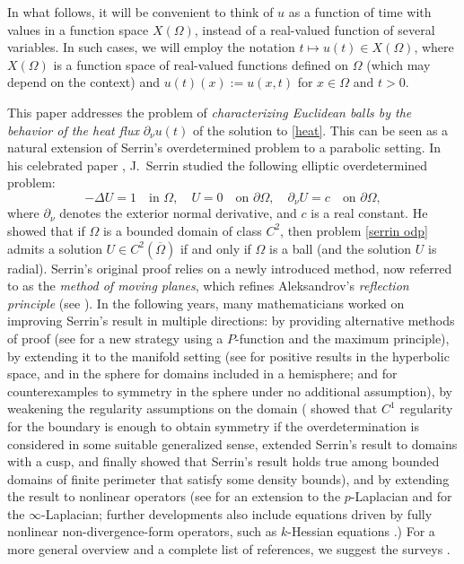 \documentclass[a4paper,11pt]{article}
\numberwithin{equation}{section}
\begin{document}
In what follows, it will be convenient to think of $u$ as a function of time with values in a function space $X(\Omega)$, instead of a real-valued function of several variables. In such cases, we will employ the notation $t\mapsto u(t)\in X(\Omega)$, where $X(\Omega)$ is a function space of real-valued functions defined on $\Omega$ (which may depend on the context) and $u(t)(x):=u(x,t)$ for $x\in \Omega$ and $t>0$. 

This paper addresses the problem of \emph{characterizing Euclidean balls by the behavior of the heat flux} $\partial_\nu u(t)$ of the solution to \eqref{heat}. This can be seen as a natural extension of Serrin's overdetermined problem to a parabolic setting. In his celebrated paper \cite{serrin1971}, J.~Serrin studied the following elliptic overdetermined problem:
\begin{equation}\label{serrin odp}
    -\Delta U = 1\quad \text{in }\Omega,\quad U=0\quad \text{on }\partial\Omega,\quad 
    \partial_\nu U = c\quad \text{on }\partial\Omega, 
\end{equation}
where $\partial_\nu$ denotes the exterior normal derivative, and $c$ is a real constant. He showed that if $\Omega$ is a bounded domain of class $C^2$, then problem \eqref{serrin odp} admits a solution $U\in C^2(\overline{\Omega})$ if and only if $\Omega$ is a ball (and the solution $U$ is radial). Serrin's original proof relies on a newly introduced method, now referred to as the \emph{method of moving planes}, which refines Aleksandrov's \emph{reflection principle} (see \cite{aleksandrov1958uniqueness}). 
In the following years, many mathematicians worked on improving Serrin's result in multiple directions: by providing alternative methods of proof (see \cite{weinberger1971remark} for a new strategy using a $P$-function and the maximum principle), by extending it to the manifold setting (see \cite{kumaresan_prajapat1998serrin} for positive results in the hyperbolic space, and in the sphere for domains included in a hemisphere; and \cite{fall&minled&weth2018serrin_on_the_sphere} for counterexamples to symmetry in the sphere under no additional assumption), by weakening the regularity assumptions on the domain (\cite{vogel1992symmetry_and_regularity} showed that $C^1$ regularity for the boundary is enough to obtain symmetry if the overdetermination is considered in some suitable generalized sense, \cite{prajapat1998serrin} extended Serrin's result to domains with a cusp, and finally  \cite{figalli&zhang2025_serrin_rough_domains} showed that Serrin's result holds true among bounded domains of finite perimeter that satisfy some density bounds), and by extending the result to nonlinear operators (see \cite{Garofalo, MR3955113,MR1776351} for an extension to the $p$-Laplacian and \cite{MR2366129,MR2232009,MR2545870} for the $\infty$-Laplacian; further developments also include equations driven by fully nonlinear non-divergence-form operators, such as $k$-Hessian equations \cite{MR2448319}.) For a more general overview and a complete list of references, we suggest the surveys \cite{MR3802818,MR3893584}.
\end{document}
